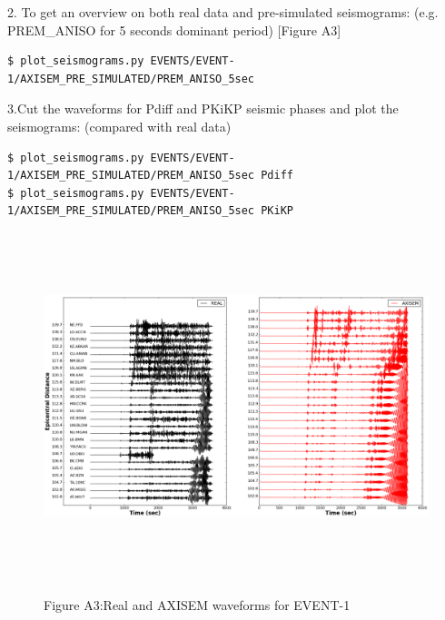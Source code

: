 \documentclass{article}
\begin{document}
\baselineskip=13pt
\leftskip=0pt
2. To get an overview on both real data and pre-simulated seismograms: (e.g. PREM\_ANISO 
for 5 seconds dominant period) [Figure A3]
\begin{verbatim}
$ plot_seismograms.py EVENTS/EVENT-1/AXISEM_PRE_SIMULATED/PREM_ANISO_5sec
\end{verbatim}

3.Cut the waveforms for Pdiff and PKiKP seismic phases and plot the seismograms: 
(compared with real data)
\begin{verbatim}
$ plot_seismograms.py EVENTS/EVENT-1/AXISEM_PRE_SIMULATED/PREM_ANISO_5sec Pdiff
$ plot_seismograms.py EVENTS/EVENT-1/AXISEM_PRE_SIMULATED/PREM_ANISO_5sec PKiKP
\end{verbatim}

\begin{figure}
\includegraphics[width=497pt, height=287pt, keepaspectratio=true]{AXISEMTutorial-fig007.png}
\begin{center}
{\small{}Figure A3:Real and AXISEM waveforms for EVENT-1}
\end{center}
\end{figure}
\end{document}
